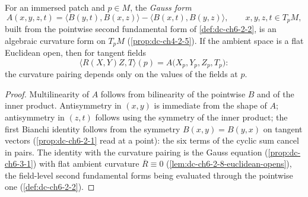 \begin{lemma}
  \label{lem:dc-ch6-2-7-gauss-form}
  \leanok
  For an immersed patch and $p\in M$, the \emph{Gauss form}
  $$
  A(x,y,z,t)=\langle B(y,t),B(x,z)\rangle-\langle B(x,t),B(y,z)\rangle,
  \qquad x,y,z,t\in T_pM,
  $$
  built from the pointwise second fundamental form of \cref{def:dc-ch6-2-2},
  is an algebraic curvature form on $T_pM$ (\cref{prop:dc-ch4-2-5}). If the
  ambient space is a flat Euclidean open, then for tangent fields
  $$
  \langle R(X,Y)Z,T\rangle(p)=A\bigl(X_p,Y_p,Z_p,T_p\bigr):
  $$
  the curvature pairing depends only on the values of the fields at $p$.
\end{lemma}
\begin{proof}
  \leanok
  Multilinearity of $A$ follows from bilinearity of the pointwise $B$ and of
  the inner product. Antisymmetry in $(x,y)$ is immediate from the shape of
  $A$; antisymmetry in $(z,t)$ follows using the symmetry of the inner
  product; the first Bianchi identity follows from the symmetry
  $B(x,y)=B(y,x)$ on tangent vectors (\cref{prop:dc-ch6-2-1} read at a
  point): the six terms of the cyclic sum cancel in pairs. The identity with
  the curvature pairing is the Gauss equation (\cref{prop:dc-ch6-3-1}) with
  flat ambient curvature $\overline{R}\equiv 0$
  (\cref{lem:dc-ch6-2-8-euclidean-opens}), the field-level second fundamental
  forms being evaluated through the pointwise one
  (\cref{def:dc-ch6-2-2}).
\end{proof}

